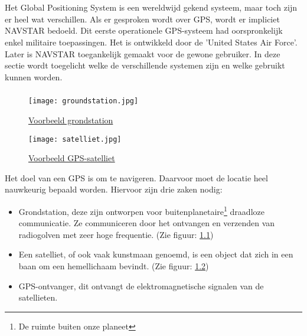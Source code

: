 \chapter{}
\label{ch:stand-van-zaken}


\section{}
Het Global Positioning System is een wereldwijd gekend systeem, maar toch zijn er heel wat verschillen. Als er gesproken wordt over GPS, wordt er impliciet NAVSTAR bedoeld.\autocite{gps} Dit eerste operationele GPS-systeem had oorspronkelijk enkel militaire toepassingen. Het is ontwikkeld door de 'United States Air Force'. \autocite{gnss}  Later is NAVSTAR toegankelijk gemaakt voor de gewone gebruiker. In deze sectie wordt toegelicht welke de verschillende systemen zijn en welke gebruikt kunnen worden.

\subsection{}
\begin{figure}
	\texttt{[image: groundstation.jpg]}
	\caption[Voorbeeld grondstation]{\href{https://www.esa.int/About_Us/ESAC/Cebreros_ground_station}{Voorbeeld grondstation \autocite{img_groundstation}}}
	\label{fig:groundstation}
\end{figure}
\begin{figure}
	\texttt{[image: satelliet.jpg]}
	\caption[Voorbeeld GPS-satelliet]{\href{https://spacenews.com/40530gps-2f-6-navigation-satellite-slated-to-launch-on-may-15/}{Voorbeeld GPS-satelliet \autocite{img_satellite}}}
	\label{fig:satelliet}
\end{figure}

Het doel van een GPS is om te navigeren. Daarvoor moet de locatie heel nauwkeurig bepaald worden. Hiervoor zijn drie zaken nodig:
\begin{itemize}
	\item Grondstation, deze zijn ontworpen voor buitenplanetaire\footnote[1]{De ruimte buiten onze planeet} draadloze communicatie. Ze communiceren door het ontvangen en verzenden van radiogolven met zeer hoge frequentie. (Zie figuur: \ref{fig:groundstation})
	\item Een satelliet, of ook vaak kunstmaan genoemd, is een object dat zich in een baan om een hemellichaam bevindt. \autocite{definitie_satelliet} (Zie figuur: \ref{fig:satelliet})
	\item GPS-ontvanger, dit ontvangt de elektromagnetische signalen van de satellieten.
\end{itemize}

